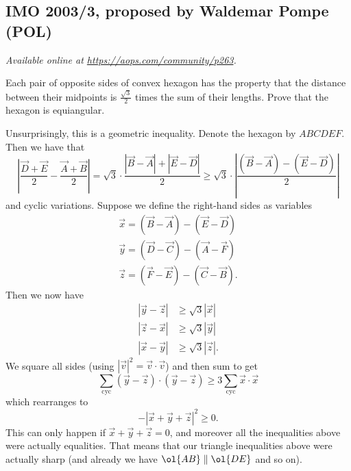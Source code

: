 \documentclass[11pt]{scrartcl}
\begin{document}
\subsection{IMO 2003/3, proposed by Waldemar Pompe (POL)}
\textsl{Available online at \url{https://aops.com/community/p263}.}
\begin{mdframed}[style=mdpurplebox,frametitle={Problem statement}]
Each pair of opposite sides of convex hexagon has the property that
the distance between their midpoints is $\frac{\sqrt3}{2}$
times the sum of their lengths.
Prove that the hexagon is equiangular.
\end{mdframed}
Unsurprisingly, this is a geometric inequality.
Denote the hexagon by $ABCDEF$.
Then we have that
\[
  \left\lvert
  \frac{\vec D + \vec E}{2} - \frac{\vec A + \vec B}{2}
  \right\rvert
  = \sqrt3 \cdot \frac{\left\lvert \vec B - \vec A \right\rvert
    + \left\lvert \vec E - \vec D \right\rvert}{2}
  \ge \sqrt 3 \cdot
  \left\lvert \frac{(\vec B - \vec A) - (\vec E - \vec D)}{2}  \right\rvert
\]
and cyclic variations.
Suppose we define the right-hand sides as variables
\begin{align*}
  \vec x = (\vec B - \vec A) - (\vec E - \vec D) \\
  \vec y = (\vec D - \vec C) - (\vec A - \vec F) \\
  \vec z = (\vec F - \vec E) - (\vec C - \vec B).
\end{align*}
Then we now have
\begin{align*}
  \left\lvert \vec y - \vec z \right\rvert
  &\ge \sqrt 3 \left\lvert \vec x  \right\rvert \\
  \left\lvert \vec z - \vec x \right\rvert
  &\ge \sqrt 3 \left\lvert \vec y  \right\rvert \\
  \left\lvert \vec x - \vec y \right\rvert
  &\ge \sqrt 3 \left\lvert \vec z  \right\rvert.
\end{align*}
We square all sides (using
$\left\lvert \vec v \right\rvert^2 = \vec v \cdot \vec v$)
and then sum to get
\[ \sum_{\text{cyc}} (\vec y - \vec z) \cdot (\vec y - \vec z)
  \ge 3 \sum_{\text{cyc}} \vec x \cdot \vec x \]
which rearranges to
\[- \left\lvert \vec x + \vec y + \vec z \right\rvert^2 \ge 0. \]
This can only happen if $\vec x + \vec y + \vec z =0$,
and moreover all the inequalities above were actually equalities.
That means that our triangle inequalities above were actually sharp
(and already we have $\ol{AB} \parallel \ol{DE}$ and so on).
\end{document}
